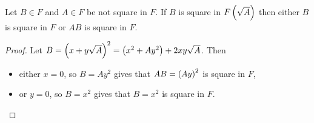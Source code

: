 \pagebreak


\begin{lemma}
\label{lem:biquadratic}
Let $ B \in F $ and $ A \in F $ be not square in $ F $. If $ B $ is square in $ F\left( \sqrt{A} \right) $ then either $ B $ is square in $ F $ or $ AB $ is square in $ F $.
\end{lemma}

\begin{proof}
Let $ B = \left( x + y\sqrt{A} \right)^2 = \left( x^2 + Ay^2 \right) + 2xy\sqrt{A} $. Then
\begin{itemize}
\item either $ x = 0 $, so $ B = Ay^2 $ gives that $ AB = \left( Ay \right)^2 $ is square in $ F $,
\item or $ y = 0 $, so $ B = x^2 $ gives that $ B = x^2 $ is square in $ F $.
\end{itemize}
\end{proof}

